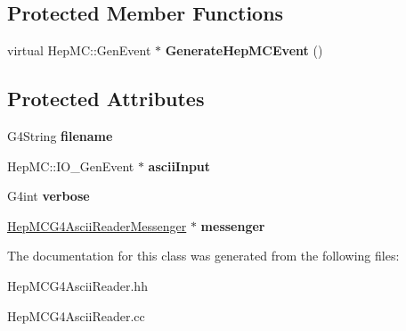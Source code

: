 \subsection*{Protected Member Functions}
\begin{DoxyCompactItemize}
\item 
\hypertarget{class_hep_m_c_g4_ascii_reader_a77b49168d34bbd03923be535c3e695e4}{}virtual Hep\+M\+C\+::\+Gen\+Event $\ast$ {\bfseries Generate\+Hep\+M\+C\+Event} ()\label{class_hep_m_c_g4_ascii_reader_a77b49168d34bbd03923be535c3e695e4}

\end{DoxyCompactItemize}
\subsection*{Protected Attributes}
\begin{DoxyCompactItemize}
\item 
\hypertarget{class_hep_m_c_g4_ascii_reader_aefd38d468f9894b503385d2d9b7be11d}{}G4\+String {\bfseries filename}\label{class_hep_m_c_g4_ascii_reader_aefd38d468f9894b503385d2d9b7be11d}

\item 
\hypertarget{class_hep_m_c_g4_ascii_reader_a4ea809bbcdcb48fddfdc508696a932a6}{}Hep\+M\+C\+::\+I\+O\+\_\+\+Gen\+Event $\ast$ {\bfseries ascii\+Input}\label{class_hep_m_c_g4_ascii_reader_a4ea809bbcdcb48fddfdc508696a932a6}

\item 
\hypertarget{class_hep_m_c_g4_ascii_reader_a13c4641c3d9c5d24ba8c028e79abb0ed}{}G4int {\bfseries verbose}\label{class_hep_m_c_g4_ascii_reader_a13c4641c3d9c5d24ba8c028e79abb0ed}

\item 
\hypertarget{class_hep_m_c_g4_ascii_reader_a5b6338d96b9c64492bdc1c87d7070cb8}{}\hyperlink{class_hep_m_c_g4_ascii_reader_messenger}{Hep\+M\+C\+G4\+Ascii\+Reader\+Messenger} $\ast$ {\bfseries messenger}\label{class_hep_m_c_g4_ascii_reader_a5b6338d96b9c64492bdc1c87d7070cb8}

\end{DoxyCompactItemize}


The documentation for this class was generated from the following files\+:\begin{DoxyCompactItemize}
\item 
Hep\+M\+C\+G4\+Ascii\+Reader.\+hh\item 
Hep\+M\+C\+G4\+Ascii\+Reader.\+cc\end{DoxyCompactItemize}
